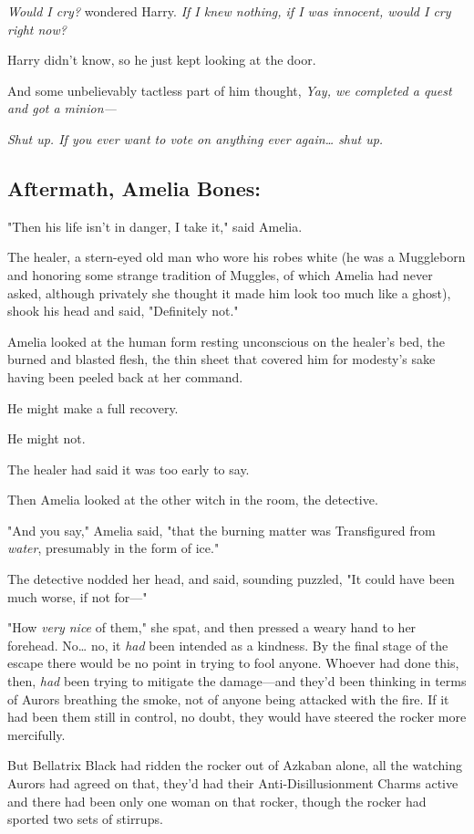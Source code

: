 \emph{Would I cry?} wondered Harry. \emph{If I knew nothing, if I was innocent, 
would I cry right now?}

Harry didn't know, so he just kept looking at the door.

And some unbelievably tactless part of him thought, \emph{Yay, we completed a 
quest and got a minion---}

\emph{Shut up. If you ever want to vote on anything ever again{\ldots} shut up.}
\sbreak
\subsection{Aftermath, Amelia Bones:}

"Then his life isn't in danger, I take it," said Amelia.

The healer, a stern-eyed old man who wore his robes white (he was a Muggleborn 
and honoring some strange tradition of Muggles, of which Amelia had never 
asked, although privately she thought it made him look too much like a ghost), 
shook his head and said, "Definitely not."

Amelia looked at the human form resting unconscious on the healer's bed, the 
burned and blasted flesh, the thin sheet that covered him for modesty's sake 
having been peeled back at her command.

He might make a full recovery.

He might not.

The healer had said it was too early to say.

Then Amelia looked at the other witch in the room, the detective.

"And you say," Amelia said, "that the burning matter was Transfigured from 
\emph{water}, presumably in the form of ice."

The detective nodded her head, and said, sounding puzzled, "It could have been 
much worse, if not for---"

"How \emph{very nice} of them," she spat, and then pressed a weary hand to her 
forehead. No{\ldots} no, it \emph{had} been intended as a kindness. By the 
final stage of the escape there would be no point in trying to fool anyone. 
Whoever had done this, then, \emph{had} been trying to mitigate the 
damage---and they'd been thinking in terms of Aurors breathing the smoke, not 
of anyone being attacked with the fire. If it had been them still in control, 
no doubt, they would have steered the rocker more mercifully.

But Bellatrix Black had ridden the rocker out of Azkaban alone, all the 
watching Aurors had agreed on that, they'd had their Anti-Disillusionment 
Charms active and there had been only one woman on that rocker, though the 
rocker had sported two sets of stirrups.

